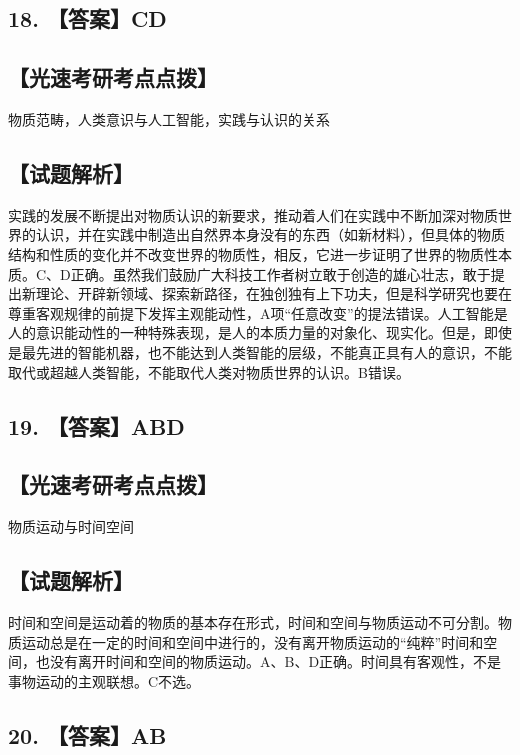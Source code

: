 \documentclass[UTF8,11pt]{ctexart}
\begin{document}
\subsection*{18. 【答案】CD}

\subsection*{【光速考研考点点拨】}

物质范畴，人类意识与人工智能，实践与认识的关系


\subsection*{【试题解析】}

实践的发展不断提出对物质认识的新要求，推动着人们在实践中不断加深对物质世界的认识，并在实践中制造出自然界本身没有的东西（如新材料），但具体的物质结构和性质的变化并不改变世界的物质性，相反，它进一步证明了世界的物质性本质。C、D正确。虽然我们鼓励广大科技工作者树立敢于创造的雄心壮志，敢于提出新理论、开辟新领域、探索新路径，在独创独有上下功夫，但是科学研究也要在尊重客观规律的前提下发挥主观能动性，A项“任意改变”的提法错误。人工智能是人的意识能动性的一种特殊表现，是人的本质力量的对象化、现实化。但是，即使是最先进的智能机器，也不能达到人类智能的层级，不能真正具有人的意识，不能取代或超越人类智能，不能取代人类对物质世界的认识。B错误。


\subsection*{19. 【答案】ABD}

\subsection*{【光速考研考点点拨】}

物质运动与时间空间


\subsection*{【试题解析】}

时间和空间是运动着的物质的基本存在形式，时间和空间与物质运动不可分割。物质运动总是在一定的时间和空间中进行的，没有离开物质运动的“纯粹”时间和空间，也没有离开时间和空间的物质运动。A、B、D正确。时间具有客观性，不是事物运动的主观联想。C不选。


\subsection*{20. 【答案】AB}
\end{document}
